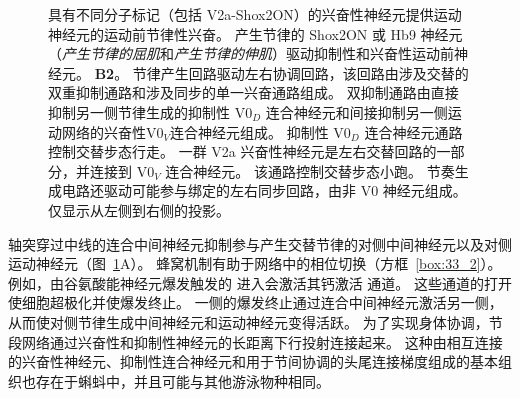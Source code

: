 \begin{figure}[htbp]
{	具有不同分子标记（包括 V2a-Shox2ON）的兴奋性神经元提供运动神经元的运动前节律性兴奋。
	产生节律的 Shox2ON 或 Hb9 神经元（\textit{产生节律的屈肌}和\textit{产生节律的伸肌}）驱动抑制性和兴奋性运动前神经元。\cite{kiehn2016decoding}
	\textbf{B2}。 节律产生回路驱动左右协调回路，该回路由涉及交替的双重抑制通路和涉及同步的单一兴奋通路组成。
	双抑制通路由直接抑制另一侧节律生成的抑制性 V0$_D$ 连合神经元和间接抑制另一侧运动网络的兴奋性V0$_V$连合神经元组成。
	抑制性 V0$_D$ 连合神经元通路控制交替步态行走。
	一群 V2a 兴奋性神经元是左右交替回路的一部分，并连接到 V0$_V$ 连合神经元。
	该通路控制交替步态小跑。
	节奏生成电路还驱动可能参与绑定的左右同步回路，由非 V0 神经元组成。
	仅显示从左侧到右侧的投影\cite{kiehn2016decoding}。}
	\label{fig:33_7}
\end{figure}


轴突穿过中线的连合中间神经元抑制参与产生交替节律的对侧中间神经元以及对侧运动神经元（图~\ref{fig:33_7}A）。
蜂窝机制有助于网络中的相位切换（方框~\ref{box:33_2}）。
例如，由谷氨酸能神经元爆发触发的  进入会激活其钙激活  通道。
这些通道的打开使细胞超极化并使爆发终止。
一侧的爆发终止通过连合中间神经元激活另一侧，从而使对侧节律生成中间神经元和运动神经元变得活跃。
为了实现身体协调，节段网络通过兴奋性和抑制性神经元的长距离下行投射连接起来。
这种由相互连接的兴奋性神经元、抑制性连合神经元和用于节间协调的头尾连接梯度组成的基本组织也存在于蝌蚪中，并且可能与其他游泳物种相同。


